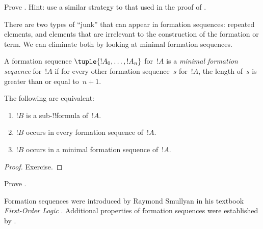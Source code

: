 \documentclass[../../../include/open-logic-section]{subfiles}
\begin{document}
\begin{prob}
Prove .
Hint: use a similar strategy to that used in the proof of
.
\end{prob}

There are two types of ``junk'' that can appear in formation
sequences: repeated elements, and elements that are irrelevant
to the construction of the formation or term. We can eliminate
both by looking at minimal formation sequences.

\begin{defn}
A formation sequence $\tuple{!A_0,\dotsc,!A_n}$ for~$!A$ is a
\emph{minimal formation sequence} for~$!A$
if for every other formation sequence~$s$ for~$!A$, the length
of~$s$ is greater than or equal to~$n+1$.
\end{defn}

\begin{prop}
The following are equivalent:
\begin{enumerate}
    \item $!B$ is a sub-!!{formula} of~$!A$.
    \item $!B$ occurs in every formation sequence of~$!A$.
    \item $!B$ occurs in a minimal formation sequence of~$!A$.
\end{enumerate}
\end{prop}

\begin{proof}
Exercise.
\end{proof}

\begin{prob}
Prove .
\end{prob}

\begin{history}
Formation sequences were introduced by Raymond Smullyan in his
textbook \emph{First-Order Logic} \citep{Smullyan1968}.
Additional properties of formation sequences were established by
\citet{Zuckerman1973}.
\end{history}
\end{document}
